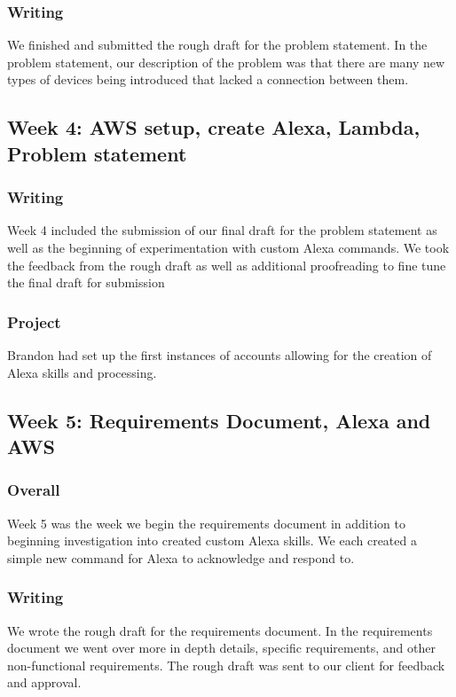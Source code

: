 \documentclass[onecolumn, draftclsnofoot,10pt, compsoc]{IEEEtran}
\begin{document}
        \subsubsection{Writing}
            We finished and submitted the rough draft for the problem statement. In the problem statement, our description of the problem was that there are many new types of devices being introduced that lacked a connection between them. 
    
    
    \subsection{Week 4: AWS setup, create Alexa, Lambda, Problem statement}
        \subsubsection{Writing}
            Week 4 included the submission of our final draft for the problem statement as well as the beginning of experimentation with custom Alexa commands. We took the feedback from the rough draft as well as additional proofreading to fine tune the final draft for submission
        \subsubsection{Project}
            Brandon had set up the first instances of accounts allowing for the creation of Alexa skills and processing. 
    
    \subsection{Week 5: Requirements Document, Alexa and AWS }
    
        \subsubsection{Overall}
            Week 5 was the week we begin the requirements document in addition to beginning investigation into created custom Alexa skills. We each created a simple new command for Alexa to acknowledge and respond to. 
            
        \subsubsection{Writing}
            We wrote the rough draft for the requirements document. In the requirements document we went over more in depth details, specific requirements, and other non-functional requirements. The rough draft was sent to our client for feedback and approval.
            
\end{document}
